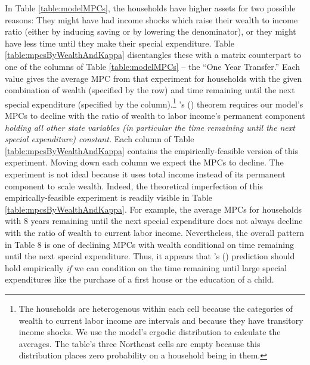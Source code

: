 \documentclass[fleqccn,12pt]{article}
\newcommand{\cites}[1]{\citeauthor{#1}'s (\citeyear{#1})}
\begin{document}
In Table \ref{table:modelMPCs}, the households have higher assets for two possible reasons:  They might have had income shocks which raise their wealth to income ratio (either by inducing saving or by lowering the denominator), or they might have less time until they make their special expenditure. Table \ref{table:mpcsByWealthAndKappa} disentangles these with a matrix counterpart to one of the columns of Table \ref{table:modelMPCs} -- the ``One Year Transfer.''  Each value gives the average MPC from that experiment for households with the given combination of wealth (specified by the row) and time remaining until the next special expenditure (specified by the column).\footnote{The households are heterogenous within each cell because the  categories of wealth to current labor income are intervals and because they have transitory income shocks. We use the model's ergodic distribution to calculate the averages. The table's three Northeast cells are empty because this distribution places zero probability on a household being in them.} \cites{ecta1996CarrollKimball} theorem requires our model's MPCs to decline with the ratio of wealth to labor income's permanent component \emph{holding all other state variables (in particular the time remaining until the next special expenditure) constant.} Each column of Table \ref{table:mpcsByWealthAndKappa} contains the empirically-feasible version of this experiment. Moving down each column we expect the MPCs to decline. The experiment is not ideal because it uses total income instead of its permanent component to scale wealth. Indeed, the theoretical imperfection of this empirically-feasible experiment is readily visible in Table \ref{table:mpcsByWealthAndKappa}. For example, the average MPCs for households with 8 years remaining until the next special expenditure does not always decline with the ratio of wealth to current labor income. Nevertheless, the overall pattern in Table 8 is one of declining MPCs with wealth conditional on time remaining until the next special expenditure. Thus, it appears that \cites{ecta1996CarrollKimball} prediction should hold empirically \emph{if} we can condition on the time remaining until large special expenditures like the purchase of a first house or the education of a child.
\end{document}
